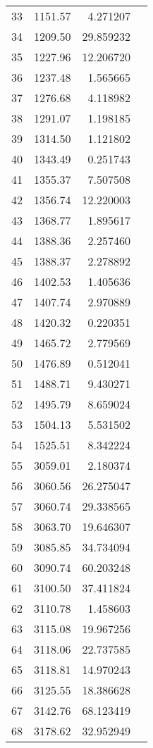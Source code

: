 \begin{tabular}{r|rr|l}
33 &     1151.57 &   4.271207  & \\
34 &     1209.50 &  29.859232  & \\
35 &     1227.96 &  12.206720  & \\
36 &     1237.48 &   1.565665  & \\
37 &     1276.68 &   4.118982  & \\
38 &     1291.07 &   1.198185  & \\
39 &     1314.50 &   1.121802  & \\
40 &     1343.49 &   0.251743  & \\
41 &     1355.37 &   7.507508  & \\
42 &     1356.74 &  12.220003  & \\
43 &     1368.77 &   1.895617  & \\
44 &     1388.36 &   2.257460  & \\
45 &     1388.37 &   2.278892  & \\
46 &     1402.53 &   1.405636  & \\
47 &     1407.74 &   2.970889  & \\
48 &     1420.32 &   0.220351  & \\
49 &     1465.72 &   2.779569  & \\
50 &     1476.89 &   0.512041  & \\
51 &     1488.71 &   9.430271  & \\
52 &     1495.79 &   8.659024  & \\
53 &     1504.13 &   5.531502  & \\
54 &     1525.51 &   8.342224  & \\
55 &     3059.01 &   2.180374  & \\
56 &     3060.56 &  26.275047  & \\
57 &     3060.74 &  29.338565  & \\
58 &     3063.70 &  19.646307  & \\
59 &     3085.85 &  34.734094  & \\
60 &     3090.74 &  60.203248  & \\
61 &     3100.50 &  37.411824  & \\
62 &     3110.78 &   1.458603  & \\
63 &     3115.08 &  19.967256  & \\
64 &     3118.06 &  22.737585  & \\
65 &     3118.81 &  14.970243  & \\
66 &     3125.55 &  18.386628  & \\
67 &     3142.76 &  68.123419  & \\
68 &     3178.62 &  32.952949  & \\
  \bottomrule
\end{tabular}

